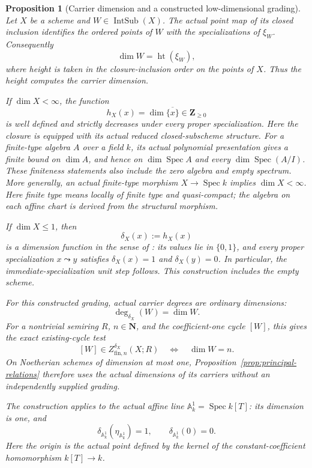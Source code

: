 \documentclass[11pt]{article}
\newtheorem{proposition}[theorem]{Proposition}
\theoremstyle{definition}
\theoremstyle{remark}
\DeclareMathOperator{\Spec}{Spec}
\begin{document}
\begin{proposition}[Carrier dimension and a constructed low-dimensional grading]
\label{prop:low-dimensional-grading}
Let \(X\) be a scheme and \(W\in\operatorname{IntSub}(X)\).
The actual point map of its closed inclusion identifies the ordered
points of \(W\) with the specializations of \(\xi_W\). Consequently
\[
  \dim W=\operatorname{ht}(\xi_W),
\]
where height is taken in the closure-inclusion order on the points of
\(X\). Thus the height computes the carrier dimension.

If \(\dim X<\infty\), the function
\[
  h_X(x)=\dim\overline{\{x\}}\in\mathbf Z_{\geq0}
\]
is well defined and strictly decreases under every proper specialization.
Here the closure is equipped with its actual reduced closed-subscheme
structure. For a finite-type algebra \(A\) over a field \(k\), its actual
polynomial presentation gives a finite bound on \(\dim A\), and hence
on \(\dim\Spec A\) and every \(\dim\Spec(A/I)\). These finiteness
statements also include the zero algebra and empty spectrum.
More generally, an actual finite-type morphism
\(X\to\Spec k\) implies \(\dim X<\infty\). Here finite type means
locally of finite type and quasi-compact; the algebra on each affine
chart is derived from the structural morphism.

If \(\dim X\leq1\), then
\[
  \delta_X(x):=h_X(x)
\]
is a dimension function in the sense of \cite{StacksDimensionFunction}:
its values lie in \(\{0,1\}\), and every proper specialization
\(x\leadsto y\) satisfies \(\delta_X(x)=1\) and
\(\delta_X(y)=0\). In particular, the immediate-specialization unit step
follows. This construction includes the empty scheme.

For this constructed grading, actual carrier degrees are ordinary
dimensions:
\[
  \deg_{\delta_X}(W)=\dim W.
\]
For a nontrivial semiring \(R\), \(n\in\mathbf N\), and the
coefficient-one cycle \([W]\), this gives the exact existing-cycle test
\[
  [W]\in Z^{\delta_X}_{\mathrm{fin},n}(X;R)
    \quad\Longleftrightarrow\quad \dim W=n.
\]
On Noetherian schemes of dimension at most one,
Proposition~\ref{prop:principal-relations} therefore uses the actual
dimensions of its carriers without an independently supplied grading.

The construction applies to the actual affine line
\(\mathbb A^1_k=\Spec k[T]\): its dimension is one, and
\[
  \delta_{\mathbb A^1_k}(\eta_{\mathbb A^1_k})=1,
  \qquad \delta_{\mathbb A^1_k}(0)=0.
\]
Here the origin is the actual point defined by the kernel of the
constant-coefficient homomorphism \(k[T]\to k\).
\end{proposition}
\end{document}
